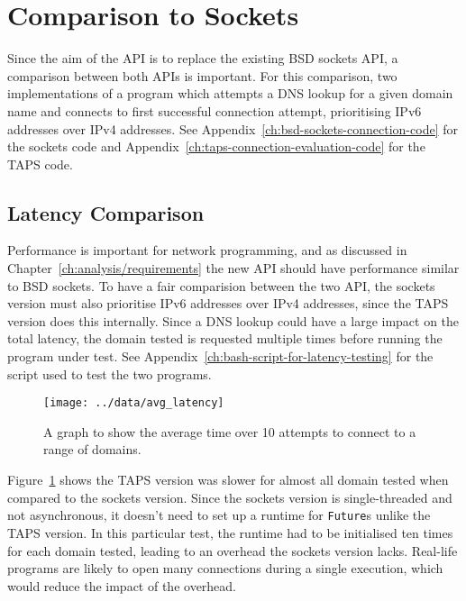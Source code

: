 \section{Comparison to Sockets}\label{sec:comparison-to-sockets}
Since the aim of the API is to replace the existing BSD sockets API, a comparison between both APIs is important.
For this comparison, two implementations of a program which attempts a DNS lookup for a given domain name and connects
to first successful connection attempt, prioritising IPv6 addresses over IPv4 addresses.
See Appendix~\ref{ch:bsd-sockets-connection-code} for the sockets code and Appendix~\ref{ch:taps-connection-evaluation-code}
for the TAPS code.

\subsection{Latency Comparison}\label{subsec:latency-comparison}
Performance is important for network programming, and as discussed in Chapter~\ref{ch:analysis/requirements} the new
API should have performance similar to BSD sockets.
To have a fair comparision between the two API, the sockets version must also prioritise IPv6 addresses over IPv4
addresses, since the TAPS version does this internally.
Since a DNS lookup could have a large impact on the total latency, the domain tested is requested multiple times before
running the program under test.
See Appendix~\ref{ch:bash-script-for-latency-testing} for the script used to test the two programs.

\begin{figure}[h]
    \texttt{[image: ../data/avg\_latency]}
    \caption{A graph to show the average time over 10 attempts to connect to a range of domains.}
    \label{fig:latency}
\end{figure}

Figure~\ref{fig:latency} shows the TAPS version was slower for almost all domain tested when compared to the sockets
version.
Since the sockets version is single-threaded and not asynchronous, it doesn't need to set up a runtime for
\texttt{Future}s unlike the TAPS version.
In this particular test, the runtime had to be initialised ten times for each domain tested, leading to an overhead the
sockets version lacks.
Real-life programs are likely to open many connections during a single execution, which would reduce the impact of the
overhead.

